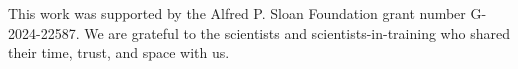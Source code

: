 \documentclass[sigconf]{acmart}
\begin{document}
\maketitle 











\begin{acks}
This work was supported by the Alfred P. Sloan Foundation grant number G-2024-22587. We are grateful to the scientists and scientists-in-training who shared their time, trust, and space with us. 
\end{acks}


\end{document}
